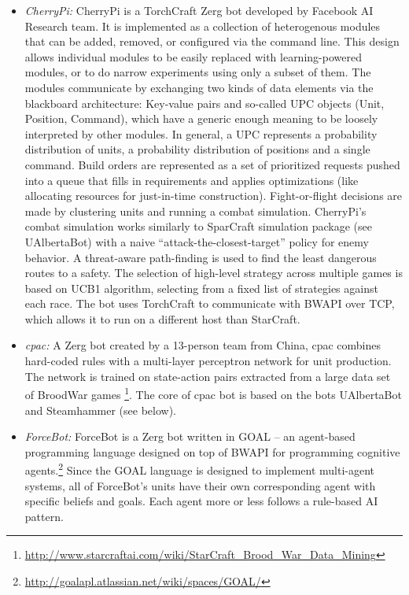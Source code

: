 \begin{itemize}
  \setlength\itemsep{1em}
  
  
  \item {\em CherryPi:} CherryPi is a TorchCraft \cite{synnaeve2016torchcraft} Zerg bot developed by Facebook AI Research team. 
  It is implemented as a collection of heterogenous modules that can be added, removed, or configured via the command line. This design allows individual modules to be easily replaced with learning-powered modules, or to do narrow experiments using only a subset of them. The modules communicate by exchanging two kinds of data elements via the blackboard architecture: Key-value pairs and so-called UPC objects (Unit, Position, Command), which have a generic enough meaning to be loosely interpreted by other modules. In general, a UPC represents a probability distribution of units, a probability distribution of positions and a single command. Build orders are represented as a set of prioritized requests pushed into a queue that fills in requirements and applies optimizations (like allocating resources for just-in-time construction). Fight-or-flight decisions are made by clustering units and running a combat simulation. CherryPi's combat simulation works similarly to SparCraft simulation package (see UAlbertaBot) with a naive ``attack-the-closest-target'' policy for enemy behavior. A threat-aware path-finding is used to find the least dangerous routes to a safety. The selection of high-level strategy across multiple games is based on UCB1 algorithm, selecting from a fixed list of strategies against each race. The bot uses TorchCraft to communicate with BWAPI over TCP, which allows it to run on a different host than StarCraft.
  
  \item {\em cpac:} A Zerg bot created by a 13-person team from China, cpac combines hard-coded rules with a multi-layer perceptron network for unit production. The network is trained on state-action pairs extracted from a large data set of BroodWar games \footnote{\url{http://www.starcraftai.com/wiki/StarCraft_Brood_War_Data_Mining}}. The core of cpac bot is based on the bots UAlbertaBot and Steamhammer (see below).
  
  \item {\em ForceBot:} ForceBot is a Zerg bot written in GOAL -- an agent-based programming language designed on top of BWAPI for programming cognitive agents.\footnote{\url{http://goalapl.atlassian.net/wiki/spaces/GOAL/}} Since the GOAL language is designed to implement multi-agent systems, all of ForceBot's units have their own corresponding agent with specific beliefs and goals. Each agent more or less follows a rule-based AI pattern.  
  

\end{itemize}
